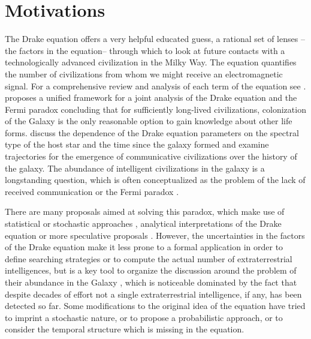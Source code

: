 \section{Motivations}\label{S_motivations}

The Drake equation \citep{drake_intelligent_1962}
offers a very helpful educated guess,
a rational set of lenses --the factors in the equation-- through which
to look at future contacts with a technologically advanced
civilization in the Milky Way.
%
The equation quantifies the number of
civilizations from whom we might receive an electromagnetic signal.
%
For a comprehensive review and analysis of each term of the equation
see \citet{vakoch_drake_2015}.
%
\citet{prantzos_joint_2013}
proposes a unified framework
for a joint analysis of the Drake equation and the Fermi paradox
concluding that for sufficiently long-lived civilizations,
colonization of the Galaxy is the only reasonable option to gain
knowledge about other life forms.
%
\citet{haqq-misra_drake_2017}
discuss the dependence of the Drake equation parameters on the
spectral type of the host star and the time since the galaxy formed
and examine trajectories for the emergence of communicative
civilizations over the history of the galaxy.
%
The abundance of
intelligent civilizations in the galaxy is a longstanding question,
which is often conceptualized as the problem of the lack of received
communication or the Fermi paradox 
\citep{barlow_galactic_2012, Sotos_biotechnology_2019,
forgan_galactic_2016}.



There are many proposals aimed at solving this paradox, which make use
of statistical \citep{solomonides_probabilistic_2016,
vanhouten_isthere_2017, horvat_calculating_2007,
maccone_statistical_2015} or stochastic approaches
\citep{forgan_numerical_2009, bloetscher_using_2019,
glade_stochastic_2011, forgan_numerical_2010}, analytical
interpretations of the Drake equation \citep{prantzos_joint_2013,
smith_broadcasting_2009} or more speculative proposals
\citep{barlow_galactic_2013, lampton_information_2013,
conway_three_2018, forgan_galactic_2017}.
%
%
However, the uncertainties in the factors of the Drake equation make
it less prone to a formal application in order to define searching
strategies or to compute the actual number of extraterrestrial
intelligences, but is a key tool
to organize the discussion around the problem of their abundance
in the Galaxy \citep{hinkel_interdisciplinary_2019}, which is
noticeable dominated by the fact that despite decades of effort not a
single extraterrestrial intelligence, if any, has been detected so far.
%
Some modifications to the original idea of the equation have tried to
imprint a stochastic nature, or to propose a probabilistic approach,
or to consider the temporal structure which is missing in the
equation.


